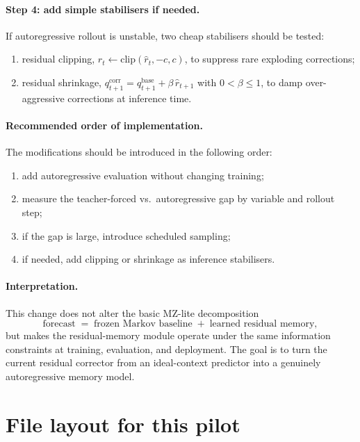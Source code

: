 \documentclass[11pt,a4paper]{article}
\begin{document}
\paragraph{Step 4: add simple stabilisers if needed.}
If autoregressive rollout is unstable, two cheap stabilisers should be tested:
\begin{enumerate}[nosep]
  \item residual clipping,
  $\hat r_t \leftarrow \mathrm{clip}(\hat r_t,-c,c)$,
  to suppress rare exploding corrections;
  \item residual shrinkage,
  $q^{\mathrm{corr}}_{t+1} = q^{\mathrm{base}}_{t+1} + \beta\,\hat r_{t+1}$ with $0 < \beta \le 1$,
  to damp over-aggressive corrections at inference time.
\end{enumerate}

\paragraph{Recommended order of implementation.}
The modifications should be introduced in the following order:
\begin{enumerate}[nosep]
  \item add autoregressive evaluation without changing training;
  \item measure the teacher-forced vs.\ autoregressive gap by variable and rollout step;
  \item if the gap is large, introduce scheduled sampling;
  \item if needed, add clipping or shrinkage as inference stabilisers.
\end{enumerate}

\paragraph{Interpretation.}
This change does not alter the basic MZ-lite decomposition
\[
\text{forecast} \;=\; \text{frozen Markov baseline} \;+\; \text{learned residual memory},
\]
but makes the residual-memory module operate under the same information constraints at training, evaluation, and deployment. The goal is to turn the current residual corrector from an ideal-context predictor into a genuinely autoregressive memory model.

\section{File layout for this pilot}
\end{document}
